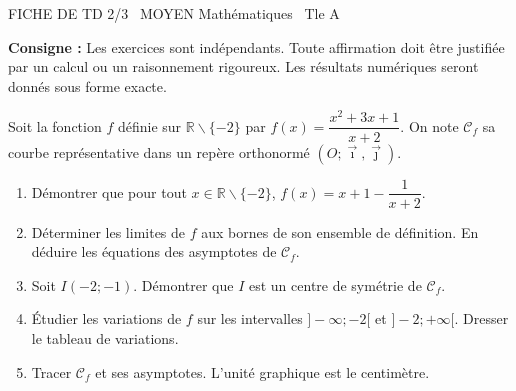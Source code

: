 \documentclass[11pt]{article}
\def\setminus{\mathbin{\backslash}}\let\smallsetminus\setminus
\begin{document}
\begin{tcolorbox}[enhanced,colback=popink,colframe=popink,arc=10pt,boxrule=0pt,left=12pt,right=12pt,top=9pt,bottom=9pt]
{\color{white}\popxbold\small FICHE DE TD 2/3 \textbullet\ MOYEN \hfill Mathématiques \textbullet\ Tle A\par}
\end{tcolorbox}
\vspace{4pt}
\noindent \textbf{Consigne :} Les exercices sont indépendants. Toute affirmation doit être justifiée par un calcul ou un raisonnement rigoureux. Les résultats numériques seront donnés sous forme exacte.

\begin{exercice}
Soit la fonction $f$ définie sur $\mathbb{R}\setminus\{-2\}$ par $f(x)=\dfrac{x^2+3x+1}{x+2}$.
On note $\mathcal{C}_f$ sa courbe représentative dans un repère orthonormé $(O;\vec{\imath},\vec{\jmath})$.
\begin{enumerate}
    \item Démontrer que pour tout $x \in \mathbb{R}\setminus\{-2\}$, $f(x)=x+1-\dfrac{1}{x+2}$.
    \item Déterminer les limites de $f$ aux bornes de son ensemble de définition. En déduire les équations des asymptotes de $\mathcal{C}_f$.
    \item Soit $I(-2;-1)$. Démontrer que $I$ est un centre de symétrie de $\mathcal{C}_f$.
    \item Étudier les variations de $f$ sur les intervalles $]-\infty;-2[$ et $]-2;+\infty[$. Dresser le tableau de variations.
    \item Tracer $\mathcal{C}_f$ et ses asymptotes. L'unité graphique est le centimètre.
\end{enumerate}
\end{exercice}
\end{document}
